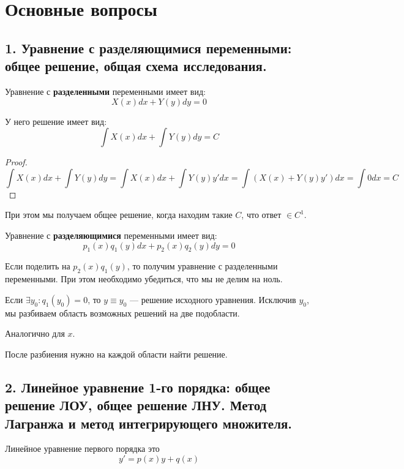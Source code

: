 

\cfoot{}

\usepackage{graphicx}

\newcommand{\tr}{\text{tr}}



\section*{Основные вопросы}

\subsection*{1. Уравнение с разделяющимися переменными: общее решение, общая схема исследования.}

Уравнение с \textbf{разделенными} переменными имеет вид:
\[X(x)dx + Y(y)dy = 0\]

У него решение имеет вид:
\[\int X(x) dx + \int Y(y)dy = C\]

\begin{proof}
    \[\int X(x) dx + \int Y(y)dy = \int X(x) dx + \int Y(y)y' dx = \int (X(x) + Y(y)y')dx = \int 0dx = C\]
\end{proof}

При этом мы получаем общее решение, когда находим такие \(C\), что ответ \(\in C^1\).

Уравнение с \textbf{разделяющимися} переменными имеет вид:
\[p_1(x)q_1(y)dx + p_2(x)q_2(y)dy = 0\]

Если поделить на \(p_2(x)q_1(y)\), то получим уравнение с разделенными переменными. При этом необходимо убедиться, что мы не делим на ноль.

Если \(\exists y_0 : q_1(y_0) = 0\), то \(y\equiv y_0\) --- решение исходного уравнения. Исключив \(y_0\), мы разбиваем область возможных решений на две подобласти.

Аналогично для \(x\).

После разбиения нужно на каждой области найти решение.

\subsection*{2. Линейное уравнение 1-го порядка: общее решение ЛОУ, общее решение ЛНУ. Метод Лагранжа и метод интегрирующего множителя.}

Линейное уравнение первого порядка это
\[y' = p(x)y + q(x)\]


